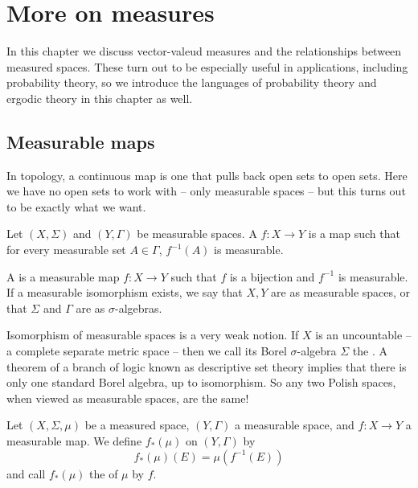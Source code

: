 
\chapter{More on measures}
In this chapter we discuss vector-valeud measures and the relationships between measured spaces.
These turn out to be especially useful in applications, including probability theory, so we introduce the languages of probability theory and ergodic theory in this chapter as well.

\section{Measurable maps}
In topology, a continuous map is one that pulls back open sets to open sets.
Here we have no open sets to work with -- only measurable spaces -- but this turns out to be exactly what we want.

\begin{definition}
Let $(X, \Sigma)$ and $(Y, \Gamma)$ be measurable spaces.
A  $f: X \to Y$ is a map such that for every measurable set $A \in \Gamma$, $f^{-1}(A)$ is measurable.

A  is a measurable map $f: X \to Y$ such that $f$ is a bijection and $f^{-1}$ is measurable.
If a measurable isomorphism exists, we say that $X,Y$ are  as measurable spaces, or that $\Sigma$ and $\Gamma$ are  as $\sigma$-algebras.
\end{definition}

\begin{example}
Isomorphism of measurable spaces is a very weak notion.
If $X$ is an uncountable  -- a complete separate metric space -- then we call its Borel $\sigma$-algebra $\Sigma$ the .
A theorem of a branch of logic known as descriptive set theory implies that there is only one standard Borel algebra, up to isomorphism.
So any two Polish spaces, when viewed as measurable spaces, are the same!
\end{example}

\begin{definition}
Let $(X, \Sigma, \mu)$ be a measured space, $(Y, \Gamma)$ a measurable space, and $f: X \to Y$ a measurable map.
We define $f_*(\mu)$ on $(Y, \Gamma)$ by
\[f_*(\mu)(E) = \mu(f^{-1}(E))\]
and call $f_*(\mu)$ the  of $\mu$ by $f$.
\end{definition}

